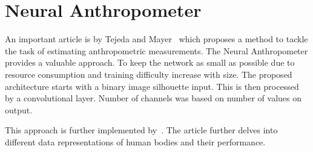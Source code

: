 \section{Neural Anthropometer}
An important article is by Tejeda and Mayer~\cite{source} which proposes a method to tackle the task of estimating anthropometric measurements. The Neural Anthropometer provides a valuable approach. To keep the network as small as possible due to resource consumption and training difficulty increase with size. The proposed architecture starts with a binary image silhouette input. This is then processed by a convolutional layer. Number of channels was based on number of values on output. 

This approach is further implemented by~\cite{super}. The article further delves into different data representations of human bodies and their performance.  
